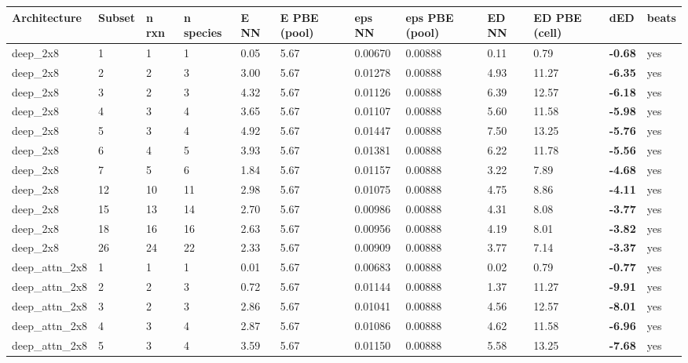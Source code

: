\documentclass[10pt,a4paper]{article}
\begin{document}
\begin{landscape}
\begin{scriptsize}
\begin{longtable}{llllllllllll}
\toprule Architecture & Subset & n rxn & n species & E NN & E PBE (pool) & eps NN & eps PBE (pool) & ED NN & ED PBE (cell) & dED & beats \\ \midrule \endhead
deep\_2x8 & 1 & 1 & 1 & 0.05 & 5.67 & 0.00670 & 0.00888 & 0.11 & 0.79 & \textbf{-0.68} & yes \\
deep\_2x8 & 2 & 2 & 3 & 3.00 & 5.67 & 0.01278 & 0.00888 & 4.93 & 11.27 & \textbf{-6.35} & yes \\
deep\_2x8 & 3 & 2 & 3 & 4.32 & 5.67 & 0.01126 & 0.00888 & 6.39 & 12.57 & \textbf{-6.18} & yes \\
deep\_2x8 & 4 & 3 & 4 & 3.65 & 5.67 & 0.01107 & 0.00888 & 5.60 & 11.58 & \textbf{-5.98} & yes \\
deep\_2x8 & 5 & 3 & 4 & 4.92 & 5.67 & 0.01447 & 0.00888 & 7.50 & 13.25 & \textbf{-5.76} & yes \\
deep\_2x8 & 6 & 4 & 5 & 3.93 & 5.67 & 0.01381 & 0.00888 & 6.22 & 11.78 & \textbf{-5.56} & yes \\
deep\_2x8 & 7 & 5 & 6 & 1.84 & 5.67 & 0.01157 & 0.00888 & 3.22 & 7.89 & \textbf{-4.68} & yes \\
deep\_2x8 & 12 & 10 & 11 & 2.98 & 5.67 & 0.01075 & 0.00888 & 4.75 & 8.86 & \textbf{-4.11} & yes \\
deep\_2x8 & 15 & 13 & 14 & 2.70 & 5.67 & 0.00986 & 0.00888 & 4.31 & 8.08 & \textbf{-3.77} & yes \\
deep\_2x8 & 18 & 16 & 16 & 2.63 & 5.67 & 0.00956 & 0.00888 & 4.19 & 8.01 & \textbf{-3.82} & yes \\
deep\_2x8 & 26 & 24 & 22 & 2.33 & 5.67 & 0.00909 & 0.00888 & 3.77 & 7.14 & \textbf{-3.37} & yes \\
deep\_attn\_2x8 & 1 & 1 & 1 & 0.01 & 5.67 & 0.00683 & 0.00888 & 0.02 & 0.79 & \textbf{-0.77} & yes \\
deep\_attn\_2x8 & 2 & 2 & 3 & 0.72 & 5.67 & 0.01144 & 0.00888 & 1.37 & 11.27 & \textbf{-9.91} & yes \\
deep\_attn\_2x8 & 3 & 2 & 3 & 2.86 & 5.67 & 0.01041 & 0.00888 & 4.56 & 12.57 & \textbf{-8.01} & yes \\
deep\_attn\_2x8 & 4 & 3 & 4 & 2.87 & 5.67 & 0.01086 & 0.00888 & 4.62 & 11.58 & \textbf{-6.96} & yes \\
deep\_attn\_2x8 & 5 & 3 & 4 & 3.59 & 5.67 & 0.01150 & 0.00888 & 5.58 & 13.25 & \textbf{-7.68} & yes \\

\end{longtable}
\end{scriptsize}
\end{landscape}
\end{document}
